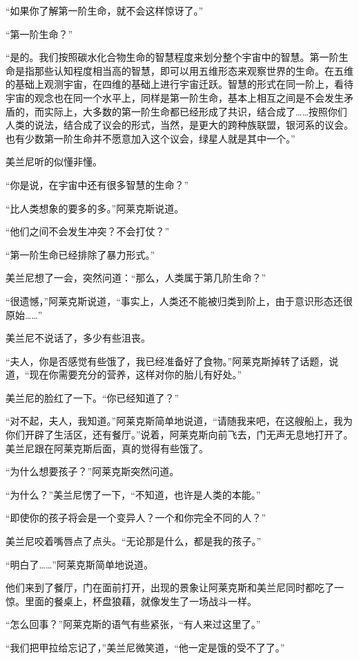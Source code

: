 “如果你了解第一阶生命，就不会这样惊讶了。”

“第一阶生命？”

“是的。我们按照碳水化合物生命的智慧程度来划分整个宇宙中的智慧。第一阶生命是指那些认知程度相当高的智慧，即可以用五维形态来观察世界的生命。在五维的基础上观测宇宙，在四维的基础上进行宇宙迁跃。智慧的形式在同一阶上，看待宇宙的观念也在同一个水平上，同样是第一阶生命，基本上相互之间是不会发生矛盾的，而实际上，大多数的第一阶生命都已经形成了共识，结合成了……按照你们人类的说法，结合成了议会的形式，当然，是更大的跨种族联盟，银河系的议会。也有少数第一阶生命并不愿意加入这个议会，绿星人就是其中一个。”

美兰尼听的似懂非懂。

“你是说，在宇宙中还有很多智慧的生命？”

“比人类想象的要多的多。”阿莱克斯说道。

“他们之间不会发生冲突？不会打仗？”

“第一阶生命已经排除了暴力形式。”

美兰尼想了一会，突然问道：“那么，人类属于第几阶生命？”

“很遗憾，”阿莱克斯说道，“事实上，人类还不能被归类到阶上，由于意识形态还很原始……”

美兰尼不说话了，多少有些沮丧。

“夫人，你是否感觉有些饿了，我已经准备好了食物。”阿莱克斯掉转了话题，说道，“现在你需要充分的营养，这样对你的胎儿有好处。”

美兰尼的脸红了一下。“你已经知道了？”

“对不起，夫人，我知道。”阿莱克斯简单地说道，“请随我来吧，在这艘船上，我为你们开辟了生活区，还有餐厅。”说着，阿莱克斯向前飞去，门无声无息地打开了。美兰尼跟在阿莱克斯后面，真的觉得有些饿了。

“为什么想要孩子？”阿莱克斯突然问道。

“为什么？”美兰尼愣了一下，“不知道，也许是人类的本能。”

“即使你的孩子将会是一个变异人？一个和你完全不同的人？”

美兰尼咬着嘴唇点了点头。“无论那是什么，都是我的孩子。”

“明白了……”阿莱克斯简单地说道。

他们来到了餐厅，门在面前打开，出现的景象让阿莱克斯和美兰尼同时都吃了一惊。里面的餐桌上，杯盘狼藉，就像发生了一场战斗一样。

“怎么回事？”阿莱克斯的语气有些紧张，“有人来过这里了。”

“我们把甲拉给忘记了，”美兰尼微笑道，“他一定是饿的受不了了。”

